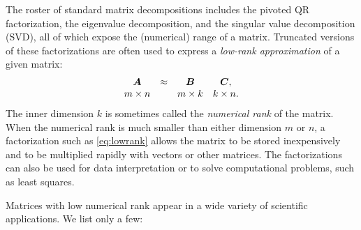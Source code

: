 \documentclass{article}
\begin{document}
The roster of standard matrix decompositions includes the pivoted QR
factorization, the eigenvalue decomposition, and the singular value
decomposition (SVD), all of which expose the (numerical) range of a
matrix. Truncated versions of these factorizations are often used to
express a \emph{low-rank approximation} of a given matrix:
\begin{equation}
\label{eq:lowrank}
\begin{array}{ccccccccccc}
\bm{A} &\approx& \bm{B} & \bm{C},\\
m\times n && m \times k & k\times n.
\end{array}
\end{equation}
The inner dimension $k$ is sometimes called the \emph{numerical rank} of the matrix.
When the numerical rank is much smaller than either dimension $m$ or $n$,
a factorization such as \eqref{eq:lowrank} allows the matrix to be stored
inexpensively and to be multiplied rapidly with vectors or other matrices.
The factorizations can also be used for data interpretation or to
solve computational problems, such as least squares.

Matrices with low numerical rank appear in a wide variety of scientific
applications.  We list only a few:

\end{document}
